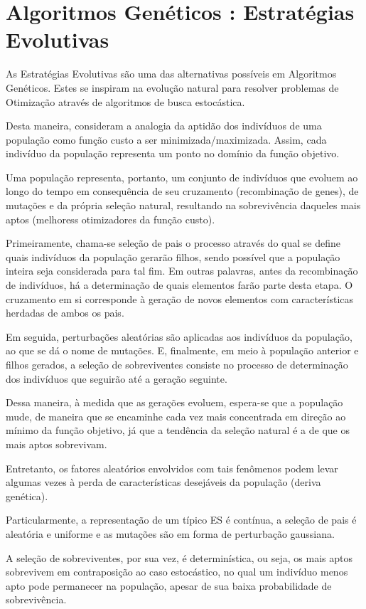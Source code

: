\documentclass[conference,compsoc]{IEEEtran}
\begin{document}
\section{Algoritmos Genéticos : Estratégias Evolutivas}

As Estratégias Evolutivas são uma das alternativas possíveis em Algoritmos Genéticos. Estes se inspiram na evolução natural para resolver problemas de Otimização através de algoritmos de busca estocástica. 

Desta maneira, consideram a analogia da  aptidão dos indivíduos de uma população como função custo a ser minimizada/maximizada. Assim, cada indivíduo da população representa um ponto no domínio da função objetivo.

Uma população representa, portanto, um conjunto de indivíduos que evoluem ao longo do tempo em consequência de seu cruzamento (recombinação de genes), de mutações e da própria seleção natural, resultando na sobrevivência daqueles mais aptos (melhoress otimizadores da função custo).

Primeiramente, chama-se seleção de pais o processo através do qual se define quais indivíduos da população gerarão filhos, sendo possível que a população inteira seja considerada para tal fim. Em outras palavras, antes da recombinação de indivíduos, há a determinação de quais elementos farão parte desta etapa. O cruzamento em si corresponde à geração de novos elementos com características herdadas de ambos os pais. 

Em seguida, perturbações aleatórias são aplicadas aos indivíduos da população, ao que se dá o nome de mutações. E, finalmente, em meio à população anterior e filhos gerados, a seleção de sobreviventes consiste no processo de determinação dos indivíduos que seguirão até a geração seguinte.

Dessa maneira, à medida que as gerações evoluem, espera-se que a população mude, de maneira que se encaminhe cada vez mais concentrada em direção ao mínimo da função objetivo, já que a tendência da seleção natural é a de que os mais aptos sobrevivam.

Entretanto, os fatores aleatórios envolvidos com tais fenômenos podem levar algumas vezes à perda de características desejáveis da população (deriva genética). 

Particularmente, a representação de um típico ES é contínua, a seleção de pais é aleatória e uniforme e as mutações são em forma de perturbação gaussiana.
 
A seleção de sobreviventes, por sua vez, é determinística, ou seja, os mais aptos sobrevivem em contraposição ao caso estocástico, no qual um indivíduo menos apto pode permanecer na população, apesar de sua baixa probabilidade de sobrevivência.
\end{document}
